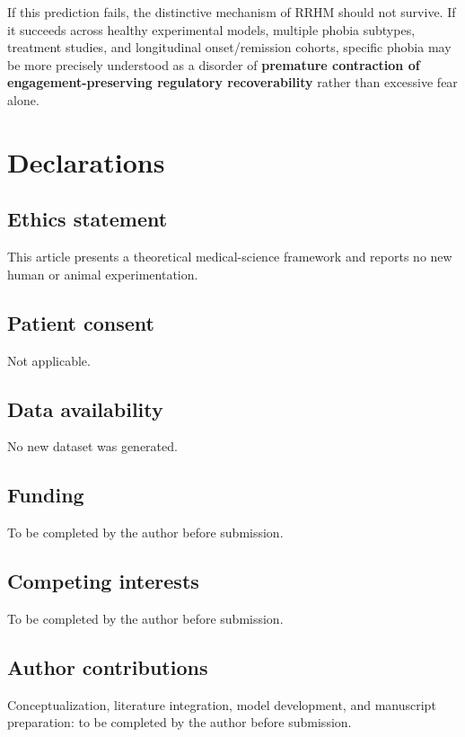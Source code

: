 \documentclass[11pt]{article}
\begin{document}
If this prediction fails, the distinctive mechanism of RRHM should not survive. If it succeeds across healthy experimental models, multiple phobia subtypes, treatment studies, and longitudinal onset/remission cohorts, specific phobia may be more precisely understood as a disorder of \textbf{premature contraction of engagement-preserving regulatory recoverability} rather than excessive fear alone.

\section*{Declarations}

\subsection*{Ethics statement}
This article presents a theoretical medical-science framework and reports no new human or animal experimentation.

\subsection*{Patient consent}
Not applicable.

\subsection*{Data availability}
No new dataset was generated.

\subsection*{Funding}
To be completed by the author before submission.

\subsection*{Competing interests}
To be completed by the author before submission.

\subsection*{Author contributions}
Conceptualization, literature integration, model development, and manuscript preparation: to be completed by the author before submission.
\end{document}
